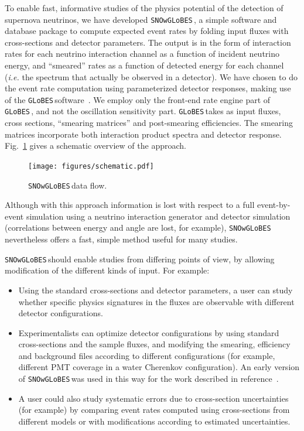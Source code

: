 \documentclass{article}
\newcommand{\snow}{\texttt{SNOwGLoBES}\,}
\newcommand{\glb}{\texttt{GLoBES}\,}
\begin{document}
To enable fast, informative studies of the physics potential of the detection of supernova neutrinos, we have developed \snow, a simple software and database package to compute expected event rates by folding input fluxes with cross-sections and detector parameters.  The output is in the form of interaction rates for each neutrino interaction channel as a function of incident neutrino energy, and ``smeared'' rates as a function of detected energy for each channel (\textit{i.e.} the spectrum that actually be observed in a detector). We have chosen to do the event rate computation using parameterized detector responses, making use of the \glb software~\cite{Huber:2004ka,globes}.  We employ only the front-end rate engine part of \glb, and not the oscillation sensitivity part.
\glb takes as input fluxes, cross sections, ``smearing matrices'' and post-smearing efficiencies.  The smearing matrices incorporate both interaction product spectra and detector response. Fig.~\ref{fig:schematic} gives a schematic overview of the approach.

\begin{figure}
\begin{center}
\texttt{[image: figures/schematic.pdf]}
\end{center}
\caption{\snow data flow.}\label{fig:schematic}
\end{figure}

Although with this approach information is lost with respect to a full event-by-event simulation using a neutrino interaction generator and detector simulation (correlations between energy and angle are lost, for example), \snow nevertheless offers a fast, simple method useful for many studies.

\snow should enable studies from differing points of view, by allowing modification of the different kinds of input.  For example:

\begin{itemize}
\item Using the standard cross-sections and detector parameters, a user can study whether specific physics signatures in the fluxes are observable with different detector configurations.

\item Experimentalists can optimize detector configurations by using standard cross-sections and the sample fluxes, and modifying the smearing, efficiency and background files according to different configurations (for example, different PMT coverage in a water Cherenkov configuration).  An early version of \snow was used in this way for the work described in reference~\cite{pwgstudy}.

\item A user could also study systematic errors due to cross-section uncertainties (for example) by comparing event rates computed using cross-sections from different models or with modifications according to estimated uncertainties.

\end{itemize}
\end{document}
